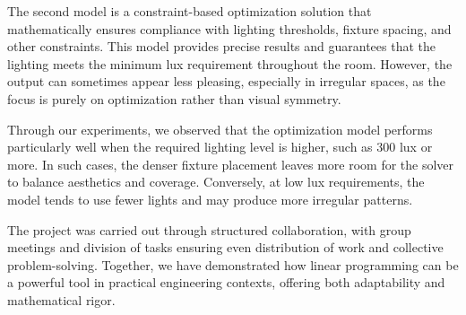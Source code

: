 \documentclass{article}
\begin{document}
The second model is a constraint-based optimization solution that mathematically ensures compliance with lighting thresholds,
fixture spacing, and other constraints. This model provides precise results and guarantees that the lighting meets the minimum lux requirement
throughout the room. However, the output can sometimes appear less pleasing, especially in irregular spaces, as the focus is purely on optimization rather than visual symmetry.

Through our experiments, we observed that the optimization model performs particularly well when the required lighting level is higher,
such as 300 lux or more. In such cases, the denser fixture placement leaves more room for the solver to balance aesthetics and coverage.
Conversely, at low lux requirements, the model tends to use fewer lights and may produce more irregular patterns.

The project was carried out through structured collaboration, with group meetings and division of tasks ensuring even distribution of work 
and collective problem-solving. Together, we have demonstrated how linear programming can be a powerful tool
in practical engineering contexts, offering both adaptability and mathematical rigor.
\end{document}
